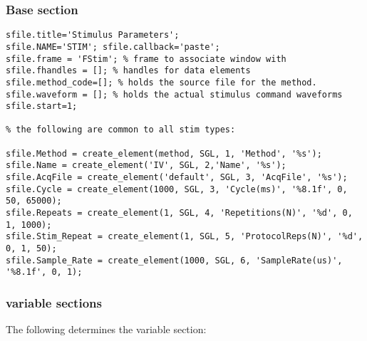 \documentclass[11pt, letterpaper, titlepage]{paper}
\begin{document}
\subsubsection{Base section}

\begin{verbatim}
sfile.title='Stimulus Parameters';
sfile.NAME='STIM'; sfile.callback='paste';
sfile.frame = 'FStim'; % frame to associate window with
sfile.fhandles = []; % handles for data elements
sfile.method_code=[]; % holds the source file for the method.
sfile.waveform = []; % holds the actual stimulus command waveforms
sfile.start=1;

% the following are common to all stim types:

sfile.Method = create_element(method, SGL, 1, 'Method', '%s');
sfile.Name = create_element('IV', SGL, 2,'Name', '%s');
sfile.AcqFile = create_element('default', SGL, 3, 'AcqFile', '%s');
sfile.Cycle = create_element(1000, SGL, 3, 'Cycle(ms)', '%8.1f', 0, 50, 65000);
sfile.Repeats = create_element(1, SGL, 4, 'Repetitions(N)', '%d', 0, 1, 1000);
sfile.Stim_Repeat = create_element(1, SGL, 5, 'ProtocolReps(N)', '%d', 0, 1, 50);
sfile.Sample_Rate = create_element(1000, SGL, 6, 'SampleRate(us)', '%8.1f', 0, 1);
\end{verbatim}

\subsubsection{variable sections}

The following determines the variable section:
\end{document}
